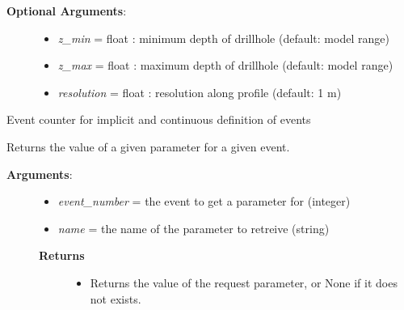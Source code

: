 \documentclass[a4paper,10pt,english]{sphinxmanual}
\begin{document}
\begin{fulllineitems}
\begin{fulllineitems}
\begin{description}
\begin{itemize}
\end{itemize}

\item[{\textbf{Optional Arguments}:}] \leavevmode\begin{itemize}
\item {} 
\emph{z\_min} = float : minimum depth of drillhole (default: model range)

\item {} 
\emph{z\_max} = float : maximum depth of drillhole (default: model range)

\item {} 
\emph{resolution} = float : resolution along profile (default: 1 m)

\end{itemize}

\end{description}

\end{fulllineitems}


\begin{fulllineitems}
\label{pynoddy:pynoddy.history.NoddyHistory.get_ev_counter}
Event counter for implicit and continuous definition of events

\end{fulllineitems}


\begin{fulllineitems}
\label{pynoddy:pynoddy.history.NoddyHistory.get_event_param}
Returns the value of a given parameter for a given event.
\begin{description}
\item[{\textbf{Arguments}:}] \leavevmode\begin{itemize}
\item {} 
\emph{event\_number} = the event to get a parameter for (integer)

\item {} 
\emph{name} = the name of the parameter to retreive (string)

\end{itemize}
\begin{description}
\item[{\textbf{Returns}}] \leavevmode\begin{itemize}
\item {} 
Returns the value of the request parameter, or None if it does not 
exists.


\end{itemize}
\end{description}
\end{description}
\end{fulllineitems}
\end{fulllineitems}
\end{document}

